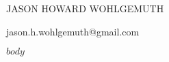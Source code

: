 \documentclass[10pt]{article}
\begin{document}
\begin{center}\Huge {JASON HOWARD WOHLGEMUTH}\end{center}
\begin{center}jason.h.wohlgemuth@gmail.com\end{center}

$body$

\end{document}
